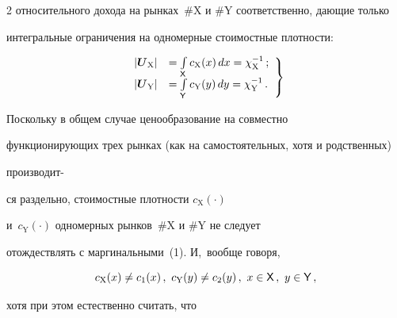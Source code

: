 \begin{multicols}{2}
относительного дохода на рынках~\#X и \#Y соответственно, дающие только 


интегральные ограничения на одномерные стоимостные плотности: 


  \begin{equation}


  \left.


  \begin{array}{rl}


  \left\vert \boldsymbol{U}_{\mathrm{X}}\right\vert &=\int\limits_{\sf X} 


c_{\mathrm{X}} (x)\,dx=\chi^{-1}_{\mathrm{X}}\,;\\[6pt] 


  \left\vert \boldsymbol{U}_{\mathrm{Y}}\right\vert &=\int\limits_{\sf Y} 


c_{\mathrm{Y}} (y)\,dy=\chi^{-1}_{\mathrm{Y}}\,.


\end{array}


\right\}


  \label{e2-ag}


  \end{equation}


  


  Поскольку в общем случае ценообразование на совместно 


функционирующих трех рынках (как на самостоятельных, хотя и родственных) 


производит-\linebreak\vspace*{-12pt}





\pagebreak





\noindent


ся раздельно, стоимостные плотности $c_{\mathrm{X}}(\cdot)$ 


и~$c_{\mathrm{Y}}(\cdot)$ одномерных рынков~\#X и \#Y не следует 


отождествлять с маргинальными~(1). И,~вообще говоря, 


  $$


  c_{\mathrm{X}}(x)\not= c_1(x)\,,\ c_{\mathrm{Y}}(y)\not= c_2(y)\,,\ x\in {\sf 


X}\,,\ y\in {\sf Y}\,,


  $$


  хотя при этом естественно считать, что 



\end{multicols}
